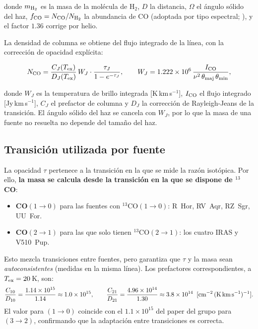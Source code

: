 \documentclass[12pt, a4paper]{article}
\begin{document}
\noindent donde $m_{{\rm H}_2}$ es la masa de la molécula de H$_2$, $D$ la distancia,
$\Omega$ el ángulo sólido del haz, $f_{\rm CO}=N_{\rm CO}/N_{\rm H_2}$ la abundancia de CO
(adoptada por tipo espectral; \citealp{ramstedt2008}), y el factor $1.36$ corrige por helio.

La densidad de columna se obtiene del flujo integrado de la línea, con la corrección de
opacidad explícita:

\begin{equation}
    N_{\rm CO} = \frac{C_J(T_{\rm ex})}{D_J(T_{\rm ex})}\, W_J \cdot
    \frac{\tau_J}{1 - e^{-\tau_J}},
    \qquad
    W_J = 1.222\times10^6\,\frac{I_{\rm CO}}{\nu^2\,\theta_{\rm maj}\,\theta_{\rm min}},
    \label{eq:NCO}
\end{equation}

\noindent donde $W_J$ es la temperatura de brillo integrada [K\,km\,s$^{-1}$], $I_{\rm CO}$ el
flujo integrado [Jy\,km\,s$^{-1}$], $C_J$ el prefactor de columna y $D_J$ la corrección de
Rayleigh-Jeans de la transición. El ángulo sólido del haz se cancela con $W_J$, por lo que
la masa de una fuente no resuelta no depende del tamaño del haz.

\subsection{Transición utilizada por fuente}

La opacidad $\tau$ pertenece a la transición en la que se mide la razón isotópica. Por ello,
\textbf{la masa se calcula desde la transición en la que se dispone de $^{13}$CO}:
\begin{itemize}
    \item \textbf{CO$(1\to0)$} para las fuentes con $^{13}$CO$(1\to0)$: R~Hor, RV~Aqr, RZ~Sgr, UU~For.
    \item \textbf{CO$(2\to1)$} para las que solo tienen $^{13}$CO$(2\to1)$: los cuatro IRAS y V510~Pup.
\end{itemize}
Esto mezcla transiciones entre fuentes, pero garantiza que $\tau$ y la masa sean
\emph{autoconsistentes} (medidas en la misma línea). Los prefactores correspondientes, a
$T_{\rm ex}=20$\,K, son:
\begin{equation}
    \frac{C_{10}}{D_{10}} = \frac{1.14\times10^{15}}{1.14} \approx 1.0\times10^{15},
    \qquad
    \frac{C_{21}}{D_{21}} = \frac{4.96\times10^{14}}{1.30} \approx 3.8\times10^{14}
    \;\;[\text{cm}^{-2}\,(\text{K\,km\,s}^{-1})^{-1}].
\end{equation}
El valor para $(1\to0)$ coincide con el $1.1\times10^{15}$ del paper del grupo para
$(3\to2)$, confirmando que la adaptación entre transiciones es correcta.
\end{document}
